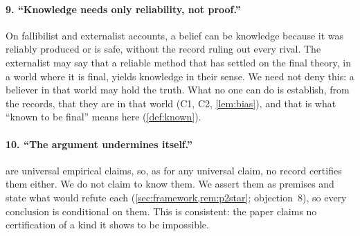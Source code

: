 \paragraph{9. ``Knowledge needs only reliability, not proof.''}
On fallibilist and externalist accounts, a belief can be knowledge because it was
reliably produced or is safe, without the record ruling out every rival. The
externalist may say that a reliable method that has settled on the final theory, in a
world where it is final, yields knowledge in their sense. We need not deny this: a
believer in that world may hold the truth. What no one can do is establish, from the
records, that they are in that world (C1, C2, \cref{lem:bias}), and that is what
``known to be final'' means here (\cref{def:known}).

\paragraph{10. ``The argument undermines itself.''}
 are universal empirical claims, so, as for any
universal claim, no record certifies them either. We do not claim to know them. We
assert them as premises and state what would refute each (\cref{sec:framework,rem:p2star};
objection~8), so every conclusion is conditional on them. This is consistent: the paper claims no certification of a kind it
shows to be impossible.
